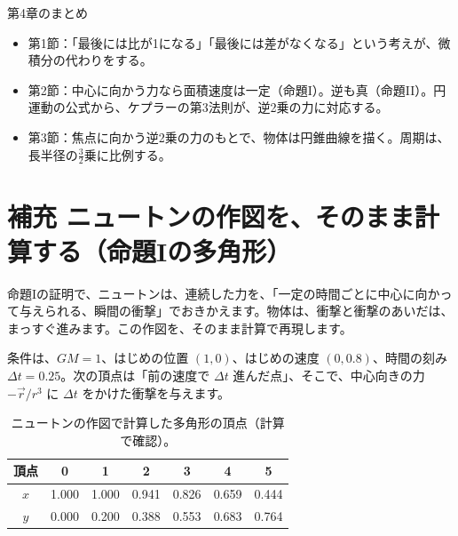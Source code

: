 \documentclass[a4paper,11pt,openany]{ltjsbook}
\begin{document}
\begin{pointbox}{第4章のまとめ}
\begin{itemize}[leftmargin=1.5em]
\item 第1節：「最後には比が1になる」「最後には差がなくなる」という考えが、微積分の代わりをする。
\item 第2節：中心に向かう力なら面積速度は一定（命題I）。逆も真（命題II）。円運動の公式から、ケプラーの第3法則が、逆2乗の力に対応する。
\item 第3節：焦点に向かう逆2乗の力のもとで、物体は円錐曲線を描く。周期は、長半径の$\frac32$乗に比例する。
\end{itemize}
\end{pointbox}

\section{補充 ニュートンの作図を、そのまま計算する（命題Iの多角形）}

命題Iの証明で、ニュートンは、連続した力を、「一定の時間ごとに中心に向かって与えられる、瞬間の衝撃」でおきかえます。物体は、衝撃と衝撃のあいだは、まっすぐ進みます。この作図を、そのまま計算で再現します。

条件は、$GM=1$、はじめの位置 $(1,0)$、はじめの速度 $(0,0.8)$、時間の刻み $\Delta t=0.25$。次の頂点は「前の速度で $\Delta t$ 進んだ点」、そこで、中心向きの力 $-\vec r/r^3$ に $\Delta t$ をかけた衝撃を与えます。

\begin{table}[htbp]
\centering
\begin{tabular}{c|cccccc}
\toprule
頂点 & 0 & 1 & 2 & 3 & 4 & 5\\
\midrule
$x$ & 1.000 & 1.000 & 0.941 & 0.826 & 0.659 & 0.444\\
$y$ & 0.000 & 0.200 & 0.388 & 0.553 & 0.683 & 0.764\\
\bottomrule
\end{tabular}
\caption{ニュートンの作図で計算した多角形の頂点（計算で確認）。}
\end{table}
\end{document}
